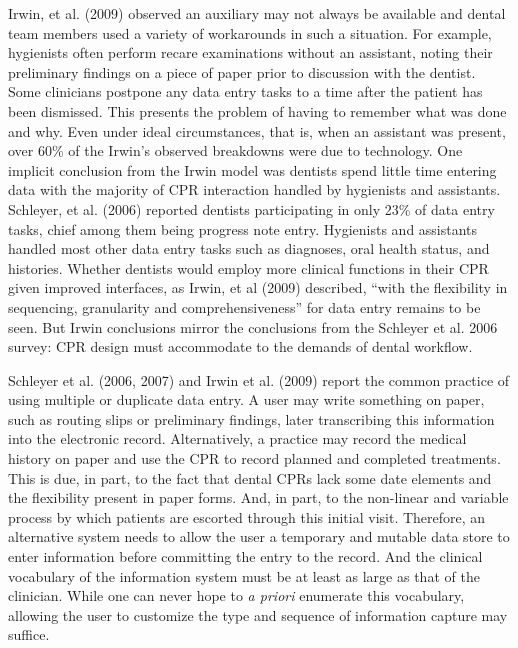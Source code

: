 \documentclass[11pt]{article}
\begin{document}
Irwin, et al. (2009) observed an auxiliary may not always be available and dental team members used a variety of workarounds in such a situation. For example, hygienists often perform recare examinations without an assistant, noting their preliminary findings on a piece of paper prior to discussion with the dentist. Some clinicians postpone any data entry tasks to a time after the patient has been dismissed. This presents the problem of having to remember what was done and why. Even under ideal circumstances, that is, when an assistant was present, over 60\% of the Irwin's observed breakdowns were due to technology. One implicit conclusion from the Irwin model was dentists spend little time entering data with the majority of CPR interaction handled by hygienists and assistants. Schleyer, et al. (2006) reported dentists participating in only 23\% of data entry tasks, chief among them being progress note entry. Hygienists and assistants handled most other data entry tasks such as diagnoses, oral health status, and histories. Whether dentists would employ more clinical functions in their CPR given improved interfaces, as Irwin, et al (2009) described, ``with the flexibility in sequencing, granularity and comprehensiveness'' for data entry remains to be seen. But Irwin conclusions mirror the conclusions from the Schleyer et al. 2006 survey: CPR design must accommodate to the demands of dental workflow.

Schleyer et al. (2006, 2007) and Irwin et al. (2009) report the common practice of using multiple or duplicate data entry. A user may write something on paper, such as routing slips or preliminary findings, later transcribing this information into the electronic record. Alternatively, a practice may record the medical history on paper and use the CPR to record planned and completed treatments. This is due, in part, to the fact that dental CPRs lack some date elements and the flexibility present in paper forms\cite{Schleyer2007A-Qualitative-I}. And, in part, to the non-linear and variable process by which patients are escorted through this initial visit. Therefore, an alternative system needs to allow the user a temporary and mutable data store to enter information before committing the entry to the record. And the clinical vocabulary of the information system must be at least as large as that of the clinician. While one can never hope to \emph{a priori} enumerate this vocabulary, allowing the user to customize the type and sequence of information capture may suffice. 
\end{document}
